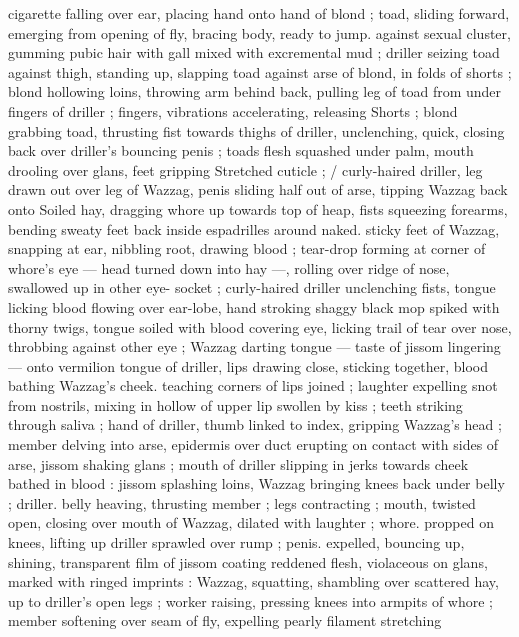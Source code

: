 {cigarette falling over ear, placing hand onto hand of blond ; toad, 
sliding forward, emerging from opening of fly, bracing body, ready to 
jump. against sexual cluster, gumming pubic hair with gall mixed with 
excremental mud ; driller seizing toad against thigh, standing up, 
slapping toad against arse of blond, in folds of shorts ; blond 
hollowing loins, throwing arm behind back, pulling leg of toad from 
under fingers of driller ; fingers, vibrations accelerating, releasing 
Shorts ; blond grabbing toad, thrusting fist towards thighs of driller, 
unclenching, quick, closing back over driller's bouncing penis ; toads 
flesh squashed under palm, mouth drooling over glans, feet gripping 
Stretched cuticle ; {\slash} curly-haired driller, leg drawn out over leg of 
Wazzag, penis sliding half out of arse, tipping Wazzag back onto 
Soiled hay, dragging whore up towards top of heap, fists squeezing 
forearms, bending sweaty feet back inside espadrilles around naked. 
sticky feet of Wazzag, snapping at ear, nibbling root, drawing blood 
; tear-drop forming at corner of whore's eye --- head turned down 
into hay ---, rolling over ridge of nose, swallowed up in other eye- 
socket ; curly-haired driller unclenching fists, tongue licking blood 
flowing over ear-lobe, hand stroking shaggy black mop spiked with 
thorny twigs, tongue soiled with blood covering eye, licking trail of 
tear over nose, throbbing against other eye ; Wazzag darting tongue 
--- taste of jissom lingering --- onto vermilion tongue of driller, lips 
drawing close, sticking together, blood bathing Wazzag's cheek. 
teaching corners of lips joined ; laughter expelling snot from 
nostrils, mixing in hollow of upper lip swollen by kiss ; teeth striking 
through saliva ; hand of driller, thumb linked to index, gripping 
Wazzag's head ; member delving into arse, epidermis over duct 
erupting on contact with sides of arse, jissom shaking glans ; mouth 
of driller slipping in jerks towards cheek bathed in blood : jissom 
splashing loins, Wazzag bringing knees back under belly ; driller. 
belly heaving, thrusting member ; legs contracting ; mouth, twisted 
open, closing over mouth of Wazzag, dilated with laughter ; whore. 
propped on knees, lifting up driller sprawled over rump ; penis. 
expelled, bouncing up, shining, transparent film of jissom coating 
reddened flesh, violaceous on glans, marked with ringed imprints : 
Wazzag, squatting, shambling over scattered hay, up to driller's open 
legs ; worker raising, pressing knees into armpits of whore ; member 
softening over seam of fly, expelling pearly filament stretching 
}
